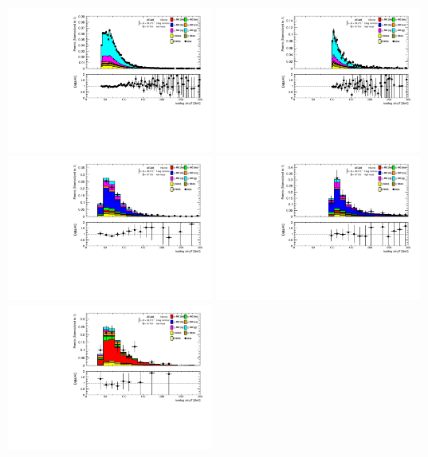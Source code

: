 \begin{figure}[htbp] %
  \centering
  \includegraphics[width=0.48\textwidth]{chapters/chapter5_yybb/images/data_MC_comparison/h_CR_l_0t_nominal_leadingJet_pt.pdf}
  \includegraphics[width=0.48\textwidth]{chapters/chapter5_yybb/images/data_MC_comparison/h_CR_h_0t_nominal_leadingJet_pt.pdf}
  \includegraphics[width=0.48\textwidth]{chapters/chapter5_yybb/images/data_MC_comparison/h_SR_l_1t_nominal_leadingJet_pt.pdf}
  \includegraphics[width=0.48\textwidth]{chapters/chapter5_yybb/images/data_MC_comparison/h_SR_h_1t_nominal_leadingJet_pt.pdf}
  \includegraphics[width=0.48\textwidth]{chapters/chapter5_yybb/images/data_MC_comparison/h_SR_l_2t_nominal_leadingJet_pt.pdf}

\end{figure}
